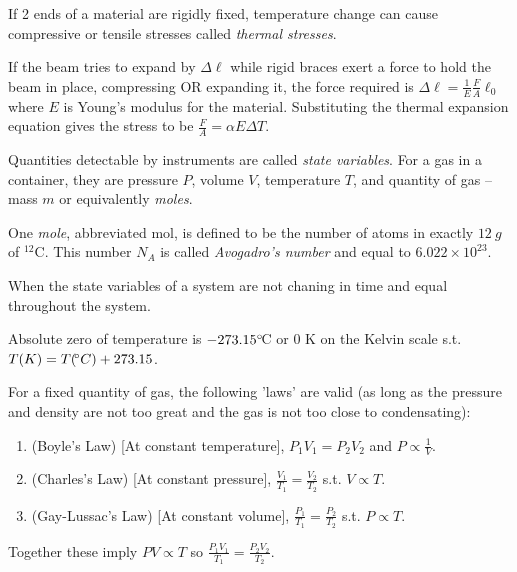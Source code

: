 \begin{definition}
    If 2 ends of a material are rigidly fixed, temperature change can cause compressive or tensile stresses called \emph{thermal stresses}.

    If the beam tries to expand by $\Delta \ell$ while rigid braces exert a force to hold the beam in place, compressing OR expanding it, the force required is $\Delta \ell = \frac{1}{E}\frac{F}{A}\ell_0$ where $E$ is Young's modulus for the material. Substituting the thermal expansion equation gives the stress to be $\frac{F}{A} = \alpha E \Delta T$.
\end{definition}
\begin{definition}
    Quantities detectable by instruments are called \emph{state variables}. For a gas in a container, they are pressure $P$, volume $V$, temperature $T$, and quantity of gas – mass $m$ or equivalently \emph{moles}.
\end{definition}
\begin{definition}[Mole]
    One \emph{mole}, abbreviated mol, is defined to be the number of atoms in exactly $\qty{12}{g}$ of $^{12}$C. This number $N_A$ is called \emph{Avogadro's number} and equal to $6.022 \times 10^{23}$.
\end{definition}
\begin{definition}
    When the state variables of a system are not chaning in time and equal throughout the system.
\end{definition}
\begin{definition}
    Absolute zero of temperature is $-273.15\operatorname{\!^{\circ}\!}$C or 0 K on the Kelvin scale s.t. $T(K) = T(\operatorname{\!^{\circ}\!} C) + 273.15$.
\end{definition}
\begin{proposition}
    For a fixed quantity of gas, the following 'laws' are valid (as long as the pressure and density are not too great and the gas is not too close to condensating):
    \begin{enumerate}
        \item (Boyle's Law) [At constant temperature], $P_1V_1 = P_2V_2$ and $P \propto \frac{1}{V}$.
        \item (Charles's Law) [At constant pressure], $\frac{V_1}{T_1}=\frac{V_2}{T_2}$ s.t. $V \propto T$.
        \item (Gay-Lussac's Law) [At constant volume], $\frac{P_1}{T_1}=\frac{P_2}{T_2}$ s.t. $P \propto T$.
    \end{enumerate}
    Together these imply $PV \propto T$ so $\frac{P_1V_1}{T_1}=\frac{P_2V_2}{T_2}$.
\end{proposition}
